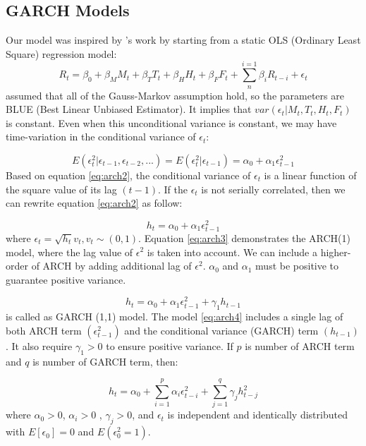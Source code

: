 \documentclass[12pt]{article}
\begin{document}
\subsection*{GARCH Models}

Our model was inspired by \cite{French1980}'s work by starting from a static OLS (Ordinary Least Square) regression model:
\begin{equation} \label{eq:ols}
    R_t=\beta_0 + \beta_M M_t + \beta_T T_t + \beta_H H_t + \beta_F F_t + \sum_n^{i=1}\beta_i R_{t-i}+ \epsilon_t 
\end{equation}
 assumed that all of the Gauss-Markov assumption hold, so the parameters are BLUE (Best Linear Unbiased Estimator). It implies that $var (\epsilon_t | M_t, T_t, H_t,F_t )$ is constant. Even when this unconditional variance is constant, we may have time-variation in the conditional variance of $\epsilon_t$:
 
\begin{equation}\label{eq:arch2}
E(\epsilon_t^2 | \epsilon_{t-1}, \epsilon_{t-2}, . . .) = E(\epsilon_t^2 | \epsilon_{t-1}) = \alpha_0 + \alpha_1\epsilon_{t-1}^2
\end{equation}
Based on equation \eqref{eq:arch2}, the conditional variance of $\epsilon_t$ is a linear function of the square value of its lag $(t-1)$. If the $\epsilon_t$ is not serially correlated, then we can rewrite equation \eqref{eq:arch2} as follow:

\begin{equation}\label{eq:arch3}
h_t= \alpha_0 +\alpha_1\epsilon_{t-1}^2
\end{equation}
 where  $\epsilon_t =\sqrt{h_t} v_t,  v_t \sim(0,1) .$ Equation \eqref{eq:arch3} demonstrates the ARCH(1) model, where the lag value of $\epsilon^2$ is taken into account. We can include a higher-order of ARCH by adding additional lag of $\epsilon^2$.  $\alpha_0$ and $\alpha_1$ must be positive to guarantee positive variance. 
 
 \begin{equation}\label{eq:arch4}
 h_t= \alpha_0 +\alpha_1\epsilon_{t-1}^2 +\gamma_1 h_{t-1}
 \end{equation}
 is called as GARCH (1,1) model. The model \eqref{eq:arch4} includes a single lag of both ARCH term $(\epsilon_{t-1}^2)$ and the conditional variance (GARCH) term $(h_{t-1})$. It also require $\gamma_1>0$ to ensure positive variance. If $p$ is number of ARCH term and $q$ is number of GARCH term, then:
 
  \begin{equation}\label{eq:garch}
h_t= \alpha_0+\sum_{i=1}^{p}\alpha_i \epsilon_{t-i}^2+\sum_{j=1}^q\gamma_j h_{t-j}^2
 \end{equation}
 where $\alpha_0 > 0$, $\alpha_i> 0$ , $\gamma_j >0$, and $\epsilon_t$ is independent and identically distributed with $E[\epsilon_0]=0$ and $E(\epsilon_0^2=1) $.
 
\end{document}
